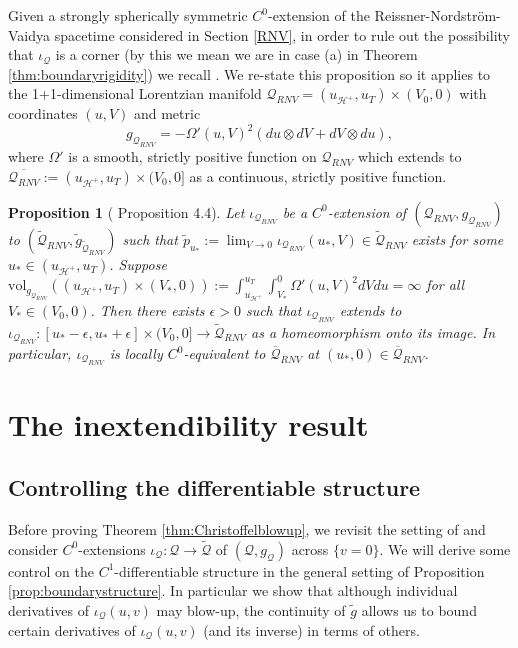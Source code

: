 \documentclass{article}
\newcommand{\Q}{\mathcal{Q}}
\newtheorem{prop}[definition]{Proposition}
\begin{document}
Given a strongly spherically symmetric $C^0$-extension of the Reissner-Nordstr\"{o}m-Vaidya spacetime considered in Section \ref{RNV}, in order to rule out the possibility that $\iota_\Q$ is a corner (by this we mean we are in case (a) in Theorem \ref{thm:boundaryrigidity}) we recall \cite[Proposition 4.4]{CameronSbierski}. 
We re-state this proposition so it applies to the 1+1-dimensional Lorentzian manifold $\Q_{RNV}=(u_{\mathcal{H}^+},u_T)\times(V_0,0)$ with coordinates $(u,V)$ and metric 
\begin{equation}
    g_{\Q_{RNV}}=-\Omega'(u,V)^2\left(du\otimes dV+dV\otimes du\right),
\end{equation}
where $\Omega'$ is a smooth, strictly positive function on $\Q_{RNV}$ which extends to $\overline{\Q_{RNV}}:=(u_{\mathcal{H}^+},u_T)\times(V_0,0]$ as a continuous, strictly positive function.
\begin{prop}[\cite{CameronSbierski} Proposition 4.4]\label{prop:cornervolumecondition}
   Let $\iota_{\Q_{RNV}}$ be a $C^0$-extension of $(\Q_{RNV},g_{\Q_{RNV}})$ to $(\tilde{\Q}_{RNV},\tilde{g}_{\tilde{\Q}_{RNV}})$ such that $\tilde{p}_{u_*}:=\lim_{V\rightarrow0}\iota_{\Q_{RNV}}(u_*,V)\in\tilde{\Q}_{RNV}$ exists for some $u_*\in(u_{\mathcal{H}^+},u_T)$. Suppose $\mathrm{vol}_{g_{\Q_{RNV}}}((u_{\mathcal{H}^+},u_T)\times(V_*,0)):=\int_{u_{\mathcal{H}^+}}^{u_T}\int_{V_*}^0\Omega'(u,V)^2dVdu=\infty$ for all $V_*\in(V_0,0)$. Then there exists $\epsilon>0$ such that $\iota_{\Q_{RNV}}$ extends to $\iota_{\Q_{RNV}}:[u_*-\epsilon,u_*+\epsilon]\times(V_0,0]\rightarrow\tilde{\Q}_{RNV}$ as a homeomorphism onto its image. In particular, $\iota_{\Q_{RNV}}$ is locally $C^0$-equivalent to $\overline{\Q}_{RNV}$ at $(u_*,0) \in \overline{\Q}_{RNV}$. 
\end{prop}

\section{The inextendibility result}
\subsection{Controlling the differentiable structure}\label{Controlling the differentiable structure}

Before proving Theorem \ref{thm:Christoffelblowup}, we revisit the setting of \cite{CameronSbierski} and consider $C^0$-extensions $\iota_{\Q} : \Q \to \tilde{\Q}$ of $(\Q, g_{\Q})$ across $\{v=0\}$. We will derive some control on the $C^1$-differentiable structure in the general setting of Proposition \ref{prop:boundarystructure}. In particular we show that although individual derivatives of $\iota_\Q(u,v)$ may blow-up, the continuity of $\tilde{g}$ allows us to bound certain derivatives of $\iota_\Q(u,v)$ (and its inverse) in terms of others.
\end{document}
